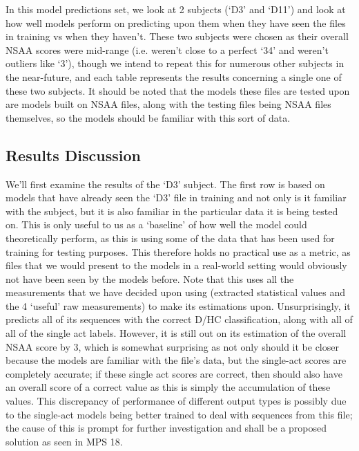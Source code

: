 \documentclass[12pt,twoside]{report}
\begin{document}
\quad In this model predictions set, we look at 2 subjects (‘D3’ and ‘D11’) and look at how well models perform on predicting upon them when they have seen the files in training vs when they haven’t. These two subjects were chosen as their overall NSAA scores were mid-range (i.e. weren’t close to a perfect ‘34’ and weren’t outliers like ‘3’), though we intend to repeat this for numerous other subjects in the near-future, and each table represents the results concerning a single one of these two subjects. It should be noted that the models these files are tested upon are models built on NSAA files, along with the testing files being NSAA files themselves, so the models should be familiar with this sort of data.

\subsection{Results Discussion}

\quad We’ll first examine the results of the ‘D3’ subject. The first row is based on models that have already seen the ‘D3’ file in training and not only is it familiar with the subject, but it is also familiar in the particular data it is being tested on. This is only useful to us as a ‘baseline’ of how well the model could theoretically perform, as this is using some of the data that has been used for training for testing purposes. This therefore holds no practical use as a metric, as files that we would present to the models in a real-world setting would obviously not have been seen by the models before. Note that this uses all the measurements that we have decided upon using (extracted statistical values and the 4 ‘useful’ raw measurements) to make its estimations upon. Unsurprisingly, it predicts all of its sequences with the correct D/HC classification, along with all of all of the single act labels. However, it is still out on its estimation of the overall NSAA score by 3, which is somewhat surprising as not only should it be closer because the models are familiar with the file’s data, but the single-act scores are completely accurate; if these single act scores are correct, then should also have an overall score of a correct value as this is simply the accumulation of these values. This discrepancy of performance of different output types is possibly due to the single-act models being better trained to deal with sequences from this file; the cause of this is prompt for further investigation and shall be a proposed solution as seen in MPS 18.\\
\end{document}
